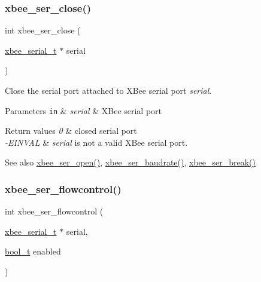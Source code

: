 \subsubsection{\texorpdfstring{xbee\+\_\+ser\+\_\+close()}{xbee\_ser\_close()}}
{\footnotesize\ttfamily int xbee\+\_\+ser\+\_\+close (\begin{DoxyParamCaption}\item[{\hyperlink{structxbee__serial__t}{xbee\+\_\+serial\+\_\+t} $\ast$}]{serial }\end{DoxyParamCaption})}



Close the serial port attached to X\+Bee serial port {\itshape serial}. 


\begin{DoxyParams}[1]{Parameters}
\mbox{\tt in}  & {\em serial} & X\+Bee serial port\\
\hline
\end{DoxyParams}

\begin{DoxyRetVals}{Return values}
{\em 0} & closed serial port \\
\hline
{\em -\/\+E\+I\+N\+V\+AL} & {\itshape serial} is not a valid X\+Bee serial port.\\
\hline
\end{DoxyRetVals}
\begin{DoxySeeAlso}{See also}
\hyperlink{group__xbee__serial_gaa615a221dd69c17ee2989c281f2bf04a}{xbee\+\_\+ser\+\_\+open()}, \hyperlink{group__xbee__serial_gab3c12543a07e0669b672c5cab54b0926}{xbee\+\_\+ser\+\_\+baudrate()}, \hyperlink{group__xbee__serial_gae19aa61eec588d1b935d267b0a982319}{xbee\+\_\+ser\+\_\+break()} 
\end{DoxySeeAlso}
\mbox{\label{group__xbee__serial_ga33229d0d63ff1442f23b0739794d3afb}} 
\subsubsection{\texorpdfstring{xbee\+\_\+ser\+\_\+flowcontrol()}{xbee\_ser\_flowcontrol()}}
{\footnotesize\ttfamily int xbee\+\_\+ser\+\_\+flowcontrol (\begin{DoxyParamCaption}\item[{\hyperlink{structxbee__serial__t}{xbee\+\_\+serial\+\_\+t} $\ast$}]{serial,  }\item[{\hyperlink{group__hal__dos_ga04dd5074964518403bf944f2b240a5f8}{bool\+\_\+t}}]{enabled }\end{DoxyParamCaption})}



